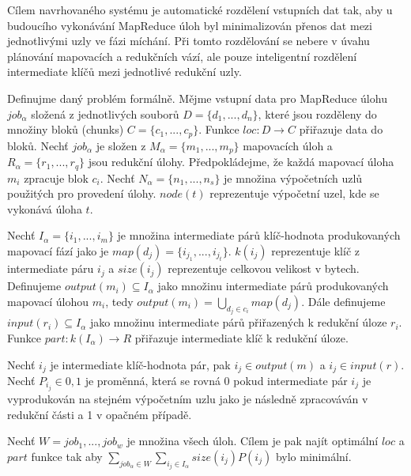 \documentclass[thesis=M,czech]{FITthesis}[2012/06/26]
\begin{document}
Cílem navrhovaného systému je automatické rozdělení vstupních dat tak, aby u budoucího vykonávání MapReduce úloh byl minimalizován přenos dat mezi jednotlivými uzly ve fázi míchání. Při tomto rozdělování se nebere v úvahu plánování mapovacích a redukčních vází, ale pouze inteligentní rozdělení intermediate klíčů mezi jednotlivé redukční uzly.

	Definujme daný problém formálně. Mějme vstupní data pro MapReduce úlohu $job_\alpha$ složená z jednotlivých souborů $D = \{d_1, ..., d_n\}$, které jsou rozděleny do  množiny bloků (chunks) $C = \{c_1, ..., c_p\}$. Funkce $loc : D \rightarrow C$ přiřazuje data do bloků. Nechť  $job_\alpha$ je složen z $M_\alpha = \{m_1, ..., m_p\}$ mapovacích úloh a $R_\alpha = \{r_1, ..., r_q\}$ jsou redukční úlohy. Předpokládejme, že každá mapovací úloha $m_i$ zpracuje blok $c_i$. Nechť  $N_\alpha = \{n_1, ..., n_s\}$ je množina výpočetních uzlů použitých pro provedení úlohy. $node(t)$ reprezentuje výpočetní uzel, kde se vykonává úloha $t$.

Nechť $I_\alpha = \{i_1, ..., i_m\}$ je množina intermediate párů klíč-hodnota produkovaných mapovací fází jako je $map(d_j) = \{i_{j_1}, ..., i_{j_t}\}$. $k(i_j)$ reprezentuje klíč z intermediate páru $i_j$ a $size(i_j)$ reprezentuje celkovou velikost v bytech. Definujeme $output(m_i) \subseteq I_\alpha$ jako množinu intermediate párů produkovaných mapovací úlohou $m_i$, tedy $output(m_i) = \bigcup_{{d_j}\in{c_i}} map(d_j)$. Dále definujeme $input(r_i)\subseteq I_\alpha$ jako množinu intermediate párů přiřazených k redukční úloze $r_i$. Funkce $part : k(I_\alpha) \rightarrow R$ přiřazuje intermediate klíč k redukční úloze. 

Nechť $i_j$ je intermediate klíč-hodnota pár, pak  $i_j \in output(m)$ a $i_j \in input(r)$. Nechť $P_{i_j} \in {0,1}$ je proměnná, která se rovná 0 pokud intermediate pár $i_j$ je vyprodukován na stejném výpočetním uzlu jako je následně zpracováván v redukční části a 1 v opačném případě.  

Nechť $W = {job_1, ..., job_w}$ je množina všech úloh. Cílem je pak najít optimální $loc$ a $part$ funkce tak aby $\sum_{job_\alpha \in W} \sum_{i_j \in I_\alpha}  size(i_j)P(i_j) $ bylo minimální.
\end{document}
